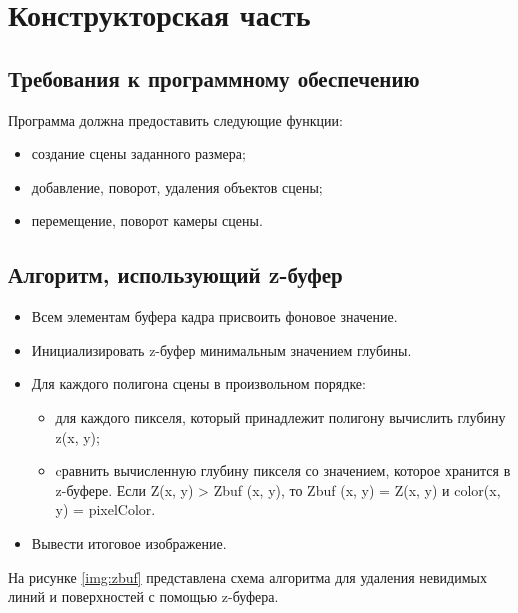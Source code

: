 \chapter{Конструкторская часть}

\section{Требования к программному обеспечению}

Программа должна предоставить следующие функции:
\begin{itemize}
    \item создание сцены заданного размера;
    \item добавление, поворот, удаления объектов сцены;
    \item перемещение, поворот камеры сцены.
\end{itemize}

\section{Алгоритм, использующий z-буфер}

\begin{itemize}
    \item Всем элементам буфера кадра присвоить фоновое значение.
    \item Инициализировать z-буфер минимальным значением глубины.
    \item Для каждого полигона сцены в произвольном порядке:	
    \begin{itemize}
        \item для каждого пикселя, который принадлежит полигону вычислить глубину z(x, y); 
        \item cравнить вычисленную глубину пикселя со значением, которое хранится в z-буфере. 
        Если Z(x, y) > Zbuf (x, y), то Zbuf (x, y) = Z(x, y) и color(x, y) = pixelColor. 
    \end{itemize}
    \item Вывести итоговое изображение.
\end{itemize}

На рисунке \ref{img:zbuf} представлена схема алгоритма для удаления 
невидимых линий и поверхностей с помощью z-буфера. 


